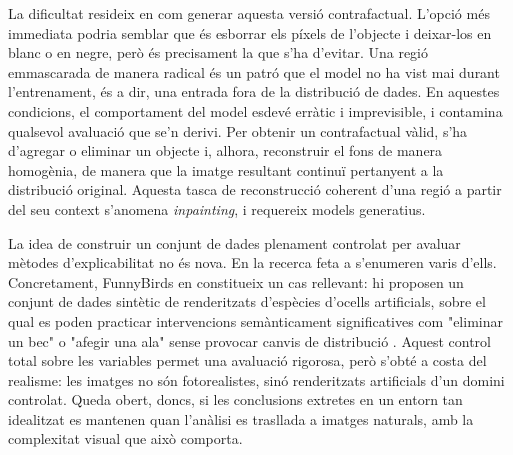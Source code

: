 La dificultat resideix en com generar aquesta versió contrafactual. L'opció més immediata podria semblar que és esborrar els píxels de l'objecte i deixar-los en blanc o en negre, però és precisament la que s'ha d'evitar. Una regió emmascarada de manera radical és un patró que el model no ha vist mai durant l'entrenament, és a dir, una entrada fora de la distribució de dades. En aquestes condicions, el comportament del model esdevé erràtic i imprevisible, i contamina qualsevol avaluació que se'n derivi. Per obtenir un contrafactual vàlid, s'ha d'agregar o eliminar un objecte i, alhora, reconstruir el fons de manera homogènia, de manera que la imatge resultant continuï pertanyent a la distribució original. Aquesta tasca de reconstrucció coherent d'una regió a partir del seu context s'anomena \emph{inpainting}, i requereix models generatius.

La idea de construir un conjunt de dades plenament controlat per avaluar mètodes d'explicabilitat no és nova. En la recerca feta a \cite{MiroNicolau2026} s'enumeren varis d'ells. Concretament, FunnyBirds \cite{Hesse2023} en constitueix un cas rellevant: hi proposen un conjunt de dades sintètic de renderitzats d'espècies d'ocells artificials, sobre el qual es poden practicar intervencions semànticament significatives com "eliminar un bec" o "afegir una ala" sense provocar canvis de distribució \cite{Hesse2023}. Aquest control total sobre les variables permet una avaluació rigorosa, però s'obté a costa del realisme: les imatges no són fotorealistes, sinó renderitzats artificials d'un domini controlat. Queda obert, doncs, si les conclusions extretes en un entorn tan idealitzat es mantenen quan l'anàlisi es trasllada a imatges naturals, amb la complexitat visual que això comporta.

